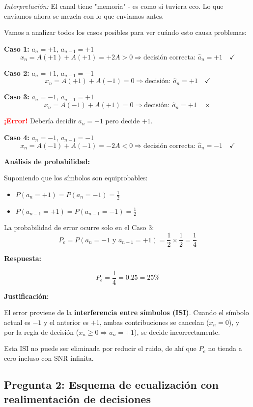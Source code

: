 \documentclass[11pt,a4paper]{article}
\begin{document}
\textit{Interpretación:} El canal tiene "memoria" - es como si tuviera eco. Lo que enviamos ahora se mezcla con lo que enviamos antes.

Vamos a analizar todos los casos posibles para ver cuándo esto causa problemas:

\textbf{Caso 1:} $a_n = +1$, $a_{n-1} = +1$
\[
x_n = A(+1) + A(+1) = +2A > 0 \Rightarrow \text{decisión correcta: } \hat{a}_n = +1 \quad \checkmark
\]

\textbf{Caso 2:} $a_n = +1$, $a_{n-1} = -1$
\[
x_n = A(+1) + A(-1) = 0 \Rightarrow \text{decisión: } \hat{a}_n = +1 \quad \checkmark
\]

\textbf{Caso 3:} $a_n = -1$, $a_{n-1} = +1$
\[
x_n = A(-1) + A(+1) = 0 \Rightarrow \text{decisión: } \hat{a}_n = +1 \quad \times
\]

\textcolor{red}{\textbf{¡Error!}} Debería decidir $\hat{a}_n = -1$ pero decide $+1$.

\textbf{Caso 4:} $a_n = -1$, $a_{n-1} = -1$
\[
x_n = A(-1) + A(-1) = -2A < 0 \Rightarrow \text{decisión correcta: } \hat{a}_n = -1 \quad \checkmark
\]

\textbf{Análisis de probabilidad:}

Suponiendo que los símbolos son equiprobables:
\begin{itemize}
    \item $P(a_n = +1) = P(a_n = -1) = \frac{1}{2}$
    \item $P(a_{n-1} = +1) = P(a_{n-1} = -1) = \frac{1}{2}$
\end{itemize}

La probabilidad de error ocurre solo en el Caso 3:
\[
P_e = P(a_n = -1 \text{ y } a_{n-1} = +1) = \frac{1}{2} \times \frac{1}{2} = \frac{1}{4}
\]

\textbf{Respuesta:}

\[
\boxed{P_e = \frac{1}{4} = 0.25 = 25\%}
\]

\textbf{Justificación:}

El error proviene de la \textbf{interferencia entre símbolos (ISI)}. Cuando el símbolo actual es $-1$ y el anterior es $+1$, ambas contribuciones se cancelan ($x_n = 0$), y por la regla de decisión ($x_n \geq 0 \Rightarrow \hat{a}_n = +1$), se decide incorrectamente.

Esta ISI no puede ser eliminada por reducir el ruido, de ahí que $P_e$ no tienda a cero incluso con SNR infinita.

\subsection*{Pregunta 2: Esquema de ecualización con realimentación de decisiones}
\end{document}
